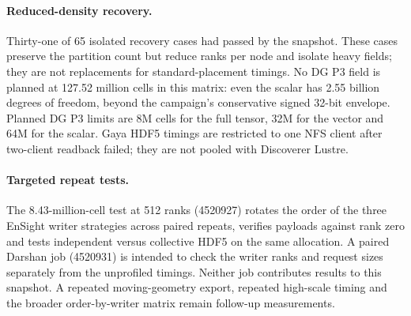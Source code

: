 \paragraph{Reduced-density recovery.}
Thirty-one of 65 isolated recovery cases had passed by the snapshot.
These cases preserve the partition count but reduce ranks per node and
isolate heavy fields; they are not replacements for standard-placement
timings. No DG P3 field is planned at 127.52 million cells in this
matrix: even the scalar has 2.55 billion degrees of freedom, beyond
the campaign's conservative signed 32-bit envelope. Planned DG P3
limits are 8M cells for the full tensor, 32M for the vector and 64M for
the scalar. Gaya HDF5 timings are restricted to one NFS client after
two-client readback failed; they are not pooled with Discoverer Lustre.

\paragraph{Targeted repeat tests.}
The 8.43-million-cell test at 512 ranks (4520927) rotates the order of the
three EnSight writer strategies across paired repeats, verifies payloads
against rank zero and tests independent versus collective HDF5 on the
same allocation. A paired Darshan job (4520931) is intended to check
the writer ranks and request sizes separately from the unprofiled
timings. Neither job contributes results to this snapshot. A repeated
moving-geometry export, repeated high-scale timing and the broader
order-by-writer matrix remain follow-up measurements.
